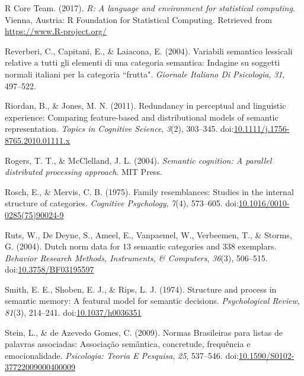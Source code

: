 \documentclass[english,,man]{apa6}
\theoremstyle{definition}
\theoremstyle{definition}
\theoremstyle{definition}
\theoremstyle{remark}
\begin{document}
\leavevmode\hypertarget{ref-R-base}{}%
R Core Team. (2017). \emph{R: A language and environment for statistical
computing}. Vienna, Austria: R Foundation for Statistical Computing.
Retrieved from \url{https://www.R-project.org/}

\leavevmode\hypertarget{ref-Reverberi2004}{}%
Reverberi, C., Capitani, E., \& Laiacona, E. (2004). Variabili semantico
lessicali relative a tutti gli elementi di una categoria semantica:
Indagine su soggetti normali italiani per la categoria ``frutta".
\emph{Giornale Italiano Di Psicologia}, \emph{31}, 497--522.

\leavevmode\hypertarget{ref-Riordan2011}{}%
Riordan, B., \& Jones, M. N. (2011). Redundancy in perceptual and
linguistic experience: Comparing feature-based and distributional models
of semantic representation. \emph{Topics in Cognitive Science},
\emph{3}(2), 303--345.
doi:\href{https://doi.org/10.1111/j.1756-8765.2010.01111.x}{10.1111/j.1756-8765.2010.01111.x}

\leavevmode\hypertarget{ref-Rogers2004}{}%
Rogers, T. T., \& McClelland, J. L. (2004). \emph{Semantic cognition: A
parallel distributed processing approach}. MIT Press.

\leavevmode\hypertarget{ref-Rosch1975}{}%
Rosch, E., \& Mervis, C. B. (1975). Family resemblances: Studies in the
internal structure of categories. \emph{Cognitive Psychology},
\emph{7}(4), 573--605.
doi:\href{https://doi.org/10.1016/0010-0285(75)90024-9}{10.1016/0010-0285(75)90024-9}

\leavevmode\hypertarget{ref-Ruts2004}{}%
Ruts, W., De Deyne, S., Ameel, E., Vanpaemel, W., Verbeemen, T., \&
Storms, G. (2004). Dutch norm data for 13 semantic categories and 338
exemplars. \emph{Behavior Research Methods, Instruments, \& Computers},
\emph{36}(3), 506--515.
doi:\href{https://doi.org/10.3758/BF03195597}{10.3758/BF03195597}

\leavevmode\hypertarget{ref-Smith1974}{}%
Smith, E. E., Shoben, E. J., \& Rips, L. J. (1974). Structure and
process in semantic memory: A featural model for semantic decisions.
\emph{Psychological Review}, \emph{81}(3), 214--241.
doi:\href{https://doi.org/10.1037/h0036351}{10.1037/h0036351}

\leavevmode\hypertarget{ref-Stein2009}{}%
Stein, L., \& de Azevedo Gomes, C. (2009). Normas Brasileiras para
listas de palavras associadas: Associação semântica, concretude,
frequência e emocionalidade. \emph{Psicologia: Teoria E Pesquisa},
\emph{25}, 537--546.
doi:\href{https://doi.org/10.1590/S0102-37722009000400009}{10.1590/S0102-37722009000400009}
\end{document}
